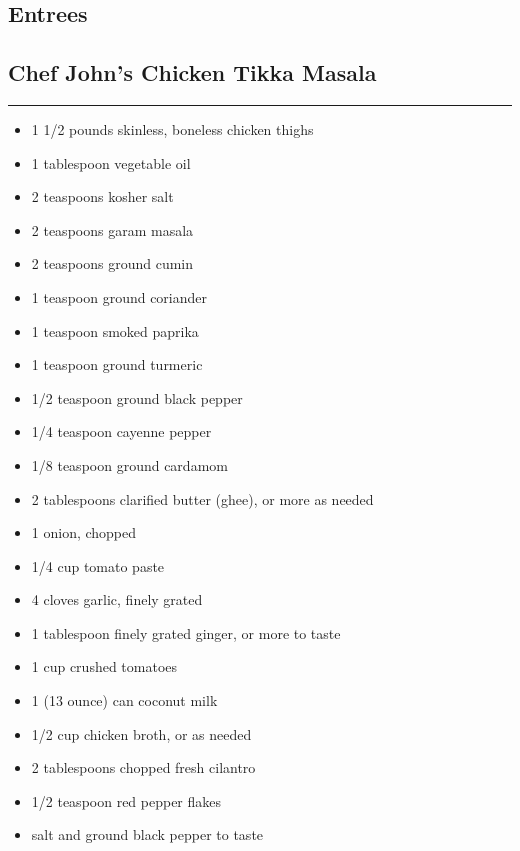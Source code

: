 \documentclass{article}
\begin{document}
\vspace*{\fill}
\begin{center}
    \section{Entrees}
\end{center}
\vspace*{\fill}
\newpage

\subsection{Chef John's Chicken Tikka Masala} 
\noindent\rule[0.5ex]{\linewidth}{1pt}

\begin{framed}
    \begin{itemize}
        \item 1 1/2 pounds skinless, boneless chicken thighs
        \item 1 tablespoon vegetable oil
        \item 2 teaspoons kosher salt
        \item 2 teaspoons garam masala
        \item 2 teaspoons ground cumin
        \item 1 teaspoon ground coriander
        \item 1 teaspoon smoked paprika
        \item 1 teaspoon ground turmeric
        \item 1/2 teaspoon ground black pepper
        \item 1/4 teaspoon cayenne pepper
        \item 1/8 teaspoon ground cardamom
        \item 2 tablespoons clarified butter (ghee), or more as needed
        \item 1 onion, chopped
        \item 1/4 cup tomato paste
        \item 4 cloves garlic, finely grated
        \item 1 tablespoon finely grated ginger, or more to taste
        \item 1 cup crushed tomatoes
        \item 1 (13 ounce) can coconut milk
        \item 1/2 cup chicken broth, or as needed
        \item 2 tablespoons chopped fresh cilantro
        \item 1/2 teaspoon red pepper flakes
        \item salt and ground black pepper to taste
    \end{itemize}
\end{framed}
\end{document}
